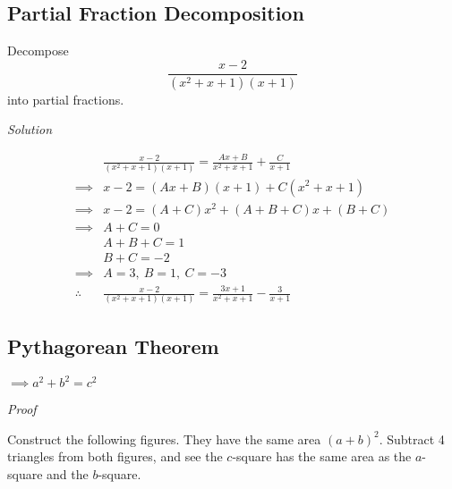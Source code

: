 \documentclass[12pt]{article}
\begin{document}
\subsection{Partial Fraction Decomposition}

Decompose $$\frac{x-2}{(x^2+x+1)(x+1)}$$ into partial fractions.

\emph{Solution}

\begin{align*}
  &\frac{x-2}{(x^2+x+1)(x+1)} = \frac{Ax+B}{x^2+x+1} + \frac{C}{x+1}\\
  \implies&x-2 = (Ax+B)(x+1) + C(x^2+x+1)\\
  \implies&x-2 = (A+C)x^2+(A+B+C)x+(B+C)\\
  \implies&A+C=0\\
  &A+B+C=1\\
  &B+C=-2\\
  \implies&A=3,~B=1,~C=-3\\
  \therefore~&\frac{x-2}{(x^2+x+1)(x+1)} = \frac{3x+1}{x^2+x+1} - \frac{3}{x+1}
\end{align*}

\subsection{Pythagorean Theorem}


$\implies a^2+b^2=c^2$

\emph{Proof}

Construct the following figures. They have the same area $(a+b)^2$. Subtract 4 triangles from both figures, and see the $c$-square has the same area as the $a$-square and the $b$-square.
\end{document}
